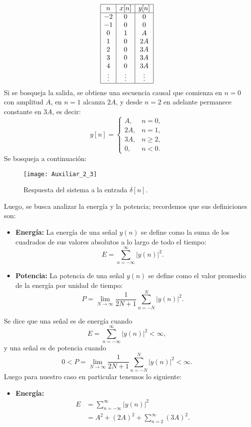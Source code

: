 \documentclass[
  11pt,
  letterpaper,
   addpoints,
  ]{exam}
\begin{document}
\begin{questions}
\begin{solution}
\[
\begin{array}{|c|c|c|}
\hline
n & x[n] & y[n] \\
\hline
-2 & 0 & 0 \\
-1 & 0 & 0 \\
0 & 1 & A \\
1 & 0 & 2A \\
2 & 0 & 3A \\
3 & 0 & 3A \\
4 & 0 & 3A \\
\vdots & \vdots & \vdots \\
\hline
\end{array}
\]
Si se bosqueja la salida, se obtiene una secuencia causal que comienza en $n=0$ con amplitud $A$, 
en $n=1$ alcanza $2A$, y desde $n=2$ en adelante permanece constante en $3A$, es decir:
\begin{equation}
y[n] = 
\begin{cases}
A, & n=0, \\
2A, & n=1, \\
3A, & n \geq 2, \\
0, & n<0.
\end{cases}
\end{equation}
Se bosqueja a continuación:
\begin{figure}[H]
  \centering
  \texttt{[image: Auxiliar\_2\_3]}
  \caption{Respuesta del sistema a la entrada $\delta[n]$.}
\end{figure}
Luego, se busca analizar la energía y la potencia; recordemos que sus definiciones son:
\begin{itemize}
  \item \textbf{Energía:} La energía de una señal $y(n)$ se define como la suma de los cuadrados de sus valores absolutos a lo largo de todo el tiempo:
\begin{equation}
E = \sum_{n=-\infty}^{\infty} |y(n)|^2.
\end{equation}
\item \textbf{Potencia:} La potencia de una señal $y(n)$ se define como el valor promedio de la energía por unidad de tiempo:
\begin{equation}
P = \lim_{N \to \infty} \frac{1}{2N+1} \sum_{n=-N}^{N} |y(n)|^2.
\end{equation}
\end{itemize}
Se dice que una señal es de energía cuando
\begin{equation}
E = \sum_{n=-\infty}^{\infty} |y(n)|^2 < \infty,
\end{equation}
y una señal es de potencia cuando
\begin{equation}
0 < P = \lim_{N \to \infty} \frac{1}{2N+1} \sum_{n=-N}^{N} |y(n)|^2 < \infty.
\end{equation}
Luego para nuestro caso en particular tenemos lo siguiente:
\begin{itemize}
\item \textbf{Energía:} 
\begin{align}
E &= \sum_{n=-\infty}^{\infty} |y(n)|^2 \\
  &= A^2 + (2A)^2 + \sum_{n=2}^{\infty} (3A)^2.
\end{align}


\end{itemize}
\end{solution}
\end{questions}
\end{document}
